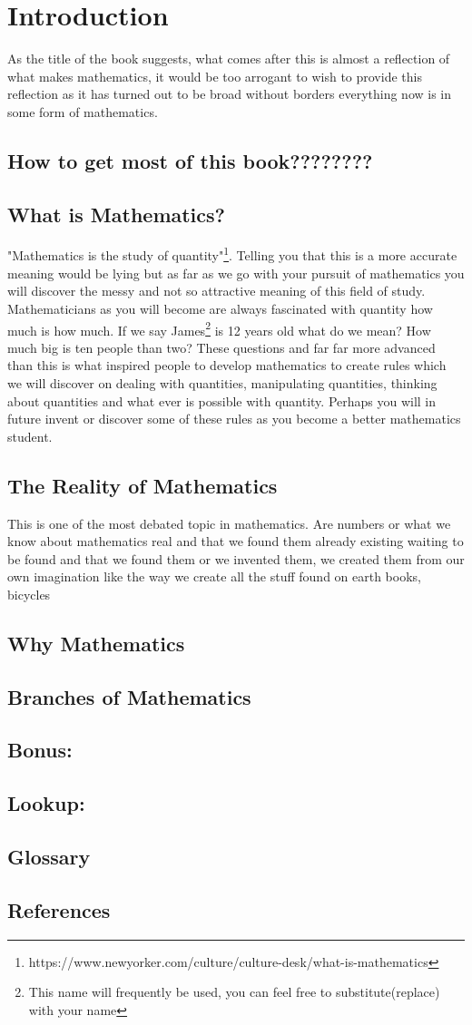 \chapter{Introduction} %
As the title of the book suggests, what comes after this is almost a reflection of what makes mathematics, it would be too arrogant to wish to provide this reflection as it has turned out to be broad without borders everything now is in some form of mathematics.
\section{How to get most of this book????????}
\section{What is Mathematics?}
"Mathematics is the study of quantity"\footnote[1]{https://www.newyorker.com/culture/culture-desk/what-is-mathematics}. Telling you that this is a more accurate meaning would be lying but as far as we go with your pursuit of mathematics you will discover the messy and not so attractive meaning of this field of study. Mathematicians as you will become are always fascinated with quantity how much is how much. If we say James\footnote[2]{This name will frequently be used, you can feel free to substitute(replace) with your name} is 12 years old what do we mean? How much big is ten people than two? These questions and far far more advanced than this is what inspired people to develop mathematics to create rules which we will discover on dealing with quantities, manipulating quantities, thinking about quantities and what ever is possible with quantity. Perhaps you will in future invent or discover some of these rules as you become a better mathematics student.

\section{The Reality of Mathematics}
This is one of the most debated topic in mathematics. Are numbers or what we know about mathematics real and that we found them already existing waiting to be found and that we found them or we invented them, we created them from our own imagination like the way we create all the stuff found on earth books, bicycles
\section{Why Mathematics}
\section{Branches of Mathematics}

\section{Bonus: }%
\section{Lookup: }%
\section{Glossary}
\section{References}

\newpage